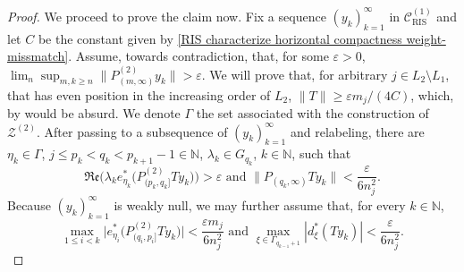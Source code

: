\documentclass[11pt]{amsart}
\theoremstyle{definition}
\newcommand{\N}{\mathbb{N}}
\newcommand{\e}{\varepsilon}
\numberwithin{equation}{section}
\begin{document}
\begin{proof}
We proceed to prove the claim now. Fix a sequence $(y_k)_{k=1}^\infty$ in $\mathcal{C}^{(1)}_\mathrm{RIS}$ and let $C$ be the constant given by  \ref{RIS characterize horizontal compactness weight-missmatch}. Assume, towards contradiction, that, for some $\e>0$, $\lim_n\sup_{m,k\geq n}\|P^{(2)}_{(m,\infty)}y_k\| > \e$. We will prove that, for arbitrary $j\in L_2\setminus L_1$, that has even position in the increasing order of $L_2$, $\|T\| \geq \e m_j/(4C)$, which, by  would be absurd. We denote $\Gamma$ the set associated with the construction of $\mathcal{Z}^{(2)}$. After passing to a subsequence of $(y_k)_{k=1}^\infty$ and relabeling, there are $\eta_k\in\Gamma$, $j\leq p_k<q_k<p_{k+1}-1\in\N$, $\lambda_k\in G_{q_k}$, $k\in\N$, such that
\begin{equation*}
\mathfrak{Re}\Big(\lambda_ke_{\eta_k}^*\big(P^{(2)}_{(p_k,q_k]}Ty_k\big)\Big) >\e \text{ and } \big\|P_{(q_k,\infty)}Ty_k\big\| < \frac{\e}{6n^2_{j}}.
\end{equation*}
Because $(y_k)_{k=1}^\infty$ is weakly null, we may further assume that, for every $k\in\N$,
\[\max_{1\leq i<k}\Big|e_{\eta_i}^*\big(P^{(2)}_{(q_i,p_i]}Ty_k\big)\Big| < \frac{\e m_{j}}{6n^2_{j}}\text{ and }\max_{\xi\in\Gamma_{q_{k-1}+1}}|d_\xi^*(Ty_k)| < \frac{\e}{6n^2_{j}}.\]


\end{proof}
\end{document}
